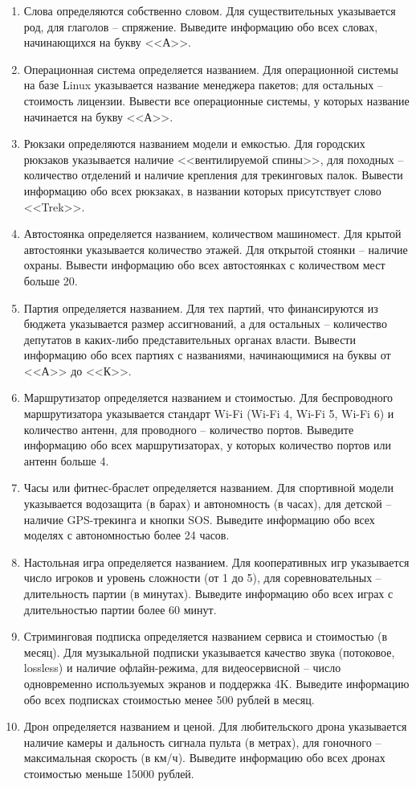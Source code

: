 \begin{enumerate}
Вопросам с вариантами правильных ответов соответствуют 4 варианта ответа и номер правильного ответа;
остальным вопросам -- формулировка правильного ответа. Выведите все вопросы, оцениваемые в 10 баллов и выше.
\item Слова определяются собственно словом. Для существительных указывается род, для глаголов --
спряжение. Выведите информацию обо всех словах, начинающихся на букву <<А>>.
\item Операционная система определяется названием. Для операционной системы на базе Linux указывается
название менеджера пакетов; для остальных -- стоимость лицензии. Вывести все операционные системы, у которых название
начинается на букву <<А>>.
\item Рюкзаки определяются названием модели и емкостью. Для городских рюкзаков указывается наличие <<вентилируемой
спины>>, для походных -- количество отделений и наличие крепления для трекинговых палок. Вывести информацию обо
всех рюкзаках, в названии которых присутствует слово <<Trek>>. 
\item Автостоянка определяется названием, количеством машиномест. Для крытой автостоянки указывается 
количество этажей. Для открытой стоянки -- наличие охраны. Вывести информацию обо всех автостоянках с количеством мест больше 20.
\item Партия определяется названием. Для тех партий, что финансируются из бюджета указывается размер
ассигнований, а для остальных -- количество депутатов в каких-либо представительных органах власти. Вывести
информацию обо всех партиях с названиями, начинающимися на буквы от <<А>> до <<К>>.
\item Маршрутизатор определяется названием и стоимостью. Для беспроводного маршрутизатора указывается
стандарт Wi-Fi (Wi-Fi 4, Wi-Fi 5, Wi-Fi 6) и количество антенн, для проводного -- количество портов.
Выведите информацию обо всех маршрутизаторах, у которых количество портов или антенн больше 4.
\item Часы или фитнес-браслет определяется названием. Для спортивной модели указывается водозащита
(в барах) и автономность (в часах), для детской -- наличие GPS-трекинга и кнопки SOS.
Выведите информацию обо всех моделях с автономностью более 24 часов.
\item Настольная игра определяется названием. Для кооперативных игр указывается число игроков и уровень
сложности (от 1 до 5), для соревновательных -- длительность партии (в минутах).
Выведите информацию обо всех играх с длительностью партии более 60 минут.
\item Стриминговая подписка определяется названием сервиса и стоимостью (в месяц). Для музыкальной
подписки указывается качество звука (потоковое, lossless) и наличие офлайн-режима, для видеосервисной --
число одновременно используемых экранов и поддержка 4K.
Выведите информацию обо всех подписках стоимостью менее 500 рублей в месяц.
\item Дрон определяется названием и ценой. Для любительского дрона указывается наличие камеры и
дальность сигнала пульта (в метрах), для гоночного -- максимальная скорость (в км/ч).
Выведите информацию обо всех дронах стоимостью меньше 15000 рублей.
\end{enumerate}

